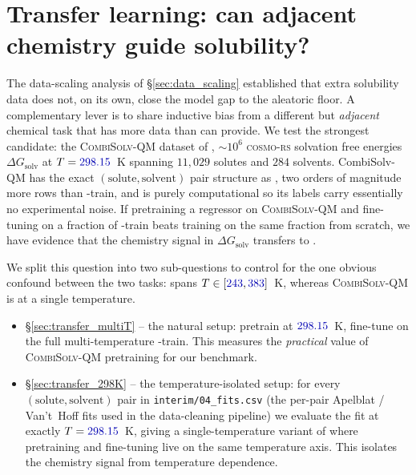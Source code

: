 \section{Transfer learning: can adjacent chemistry guide solubility?}
\label{sec:transfer}

The data-scaling analysis of §\ref{sec:data_scaling} established that
extra \scthree{} solubility data does not, on its own, close the model
gap to the aleatoric floor.  A complementary lever is to share
inductive bias from a different but \emph{adjacent} chemical task that
has more data than \scthree{} can provide.  We test the strongest
candidate: the \textsc{CombiSolv-QM} dataset of
\citet{vermeire2021transfer}, $\sim$$10^6$ \textsc{cosmo-rs} solvation
free energies $\Delta G_{\text{solv}}$ at $T = \numval{298.15}$~K
spanning $11{,}029$ solutes and $284$ solvents.  CombiSolv-QM has the
exact $({\text{solute}}, {\text{solvent}})$ pair structure as
\scthree{}, two orders of magnitude more rows than \scthree{}-train,
and is purely computational so its labels carry essentially no
experimental noise.  If pretraining a regressor on
\textsc{CombiSolv-QM} and fine-tuning on a fraction of \scthree{}-train
beats training on the same fraction from scratch, we have evidence
that the chemistry signal in $\Delta G_{\text{solv}}$ transfers to
\logS{}.

We split this question into two sub-questions to control for the one
obvious confound between the two tasks: \scthree{} spans
$T \in [\numval{243}, \numval{383}]$~K, whereas
\textsc{CombiSolv-QM} is at a single temperature.

\begin{itemize}[leftmargin=*]
  \item §\ref{sec:transfer_multiT} -- the natural setup: pretrain at
        $\numval{298.15}$~K, fine-tune on the full multi-temperature
        \scthree{}-train.  This measures the \emph{practical} value
        of \textsc{CombiSolv-QM} pretraining for our benchmark.
  \item §\ref{sec:transfer_298K} -- the temperature-isolated setup:
        for every $({\text{solute}}, {\text{solvent}})$ pair in
        \texttt{interim/04\_fits.csv} (the per-pair Apelblat /
        Van't~Hoff fits used in the data-cleaning pipeline) we
        evaluate the fit at exactly $T = \numval{298.15}$~K, giving
        a single-temperature variant of \scthree{} where pretraining
        and fine-tuning live on the same temperature axis.  This
        isolates the chemistry signal from temperature dependence.
\end{itemize}

